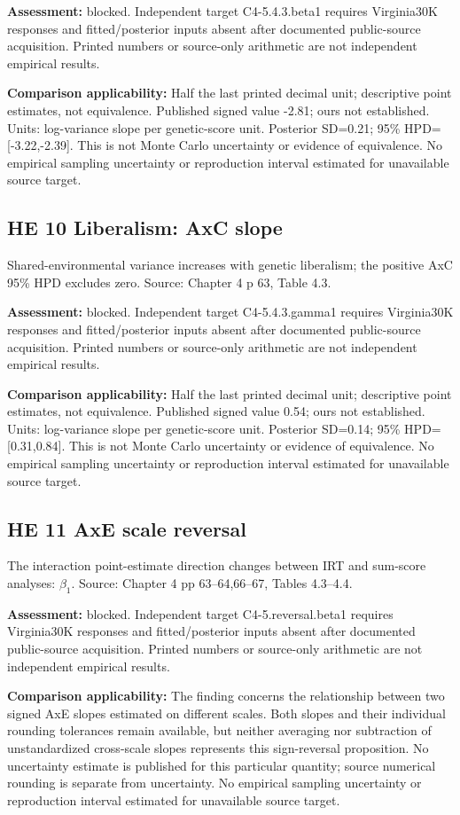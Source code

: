 \documentclass[11pt]{article}
\begin{document}
\textbf{Assessment:} blocked. Independent target C4-5.4.3.beta1 requires Virginia30K responses and fitted/posterior inputs absent after documented public-source acquisition. Printed numbers or source-only arithmetic are not independent empirical results.

\textbf{Comparison applicability:} Half the last printed decimal unit; descriptive point estimates, not equivalence. Published signed value -2.81; ours not established. Units: log-variance slope per genetic-score unit. Posterior SD=0.21; 95\% HPD=[-3.22,-2.39]. This is not Monte Carlo uncertainty or evidence of equivalence. No empirical sampling uncertainty or reproduction interval estimated for unavailable source target.
\subsection{HE 10 Liberalism: AxC slope}\label{head:HE10}
Shared-environmental variance increases with genetic liberalism; the positive AxC 95\% HPD excludes zero. Source: Chapter 4 p 63, Table 4.3.

\textbf{Assessment:} blocked. Independent target C4-5.4.3.gamma1 requires Virginia30K responses and fitted/posterior inputs absent after documented public-source acquisition. Printed numbers or source-only arithmetic are not independent empirical results.

\textbf{Comparison applicability:} Half the last printed decimal unit; descriptive point estimates, not equivalence. Published signed value 0.54; ours not established. Units: log-variance slope per genetic-score unit. Posterior SD=0.14; 95\% HPD=[0.31,0.84]. This is not Monte Carlo uncertainty or evidence of equivalence. No empirical sampling uncertainty or reproduction interval estimated for unavailable source target.
\subsection{HE 11 AxE scale reversal}\label{head:HE11}
The interaction point-estimate direction changes between IRT and sum-score analyses: $\beta_1$. Source: Chapter 4 pp 63--64,66--67, Tables 4.3--4.4.

\textbf{Assessment:} blocked. Independent target C4-5.reversal.beta1 requires Virginia30K responses and fitted/posterior inputs absent after documented public-source acquisition. Printed numbers or source-only arithmetic are not independent empirical results.

\textbf{Comparison applicability:} The finding concerns the relationship between two signed AxE slopes estimated on different scales. Both slopes and their individual rounding tolerances remain available, but neither averaging nor subtraction of unstandardized cross-scale slopes represents this sign-reversal proposition. No uncertainty estimate is published for this particular quantity; source numerical rounding is separate from uncertainty. No empirical sampling uncertainty or reproduction interval estimated for unavailable source target.
\end{document}
